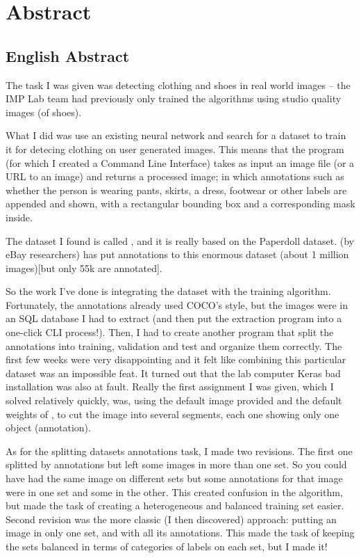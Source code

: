 \chapter*{Abstract}
\section*{English Abstract}

The task I was given was detecting clothing and shoes in real world images -- the IMP Lab team had previously only trained the algorithms using studio quality images (of shoes).

What I did was use an existing neural network and search for a dataset to train it for detecing clothing on user generated images. This means that the program (for which I created a Command Line Interface) takes as input an image file (or a URL to an image) and returns a processed image; in which annotations such as whether the person is wearing pants, skirts, a dress, footwear or other labels are appended and shown, with a rectangular bounding box and a corresponding mask inside.

The dataset I found is called \modanet, and it is really based on the Paperdoll dataset. \modanet (by eBay researchers) has put annotations to this enormous dataset (about 1 million images)[but only 55k are annotated].

So the work I've done is integrating the dataset with the training algorithm. Fortunately, the \modanet annotations already used COCO's style, but the images were in an SQL database I had to extract (and then put the extraction program into a one-click CLI process!).
Then, I had to create another program that split the annotations into training, validation and test and organize them correctly. The first few weeks were very disappointing and it felt like combining this particular dataset was an impossible feat. It turned out that the lab computer Keras bad installation was also at fault.
Really the first assignment I was given, which I solved relatively quickly, was, using the default image provided and the default weights of \maskrcnn, to cut the image into several segments, each one showing only one object (annotation).

As for the splitting datasets annotations task, I made two revisions. The first one splitted by annotations but left some images in more than one set. So you could have had the same image on different sets but some annotations for that image were in one set and some in the other. This created confusion in the algorithm, but made the task of creating a heterogeneous and balanced training set easier. Second revision was the more classic (I then discovered) approach: putting an image in only one set, and with all its annotations. This made the task of keeping the sets balanced in terms of categories of labels on each set, but I made it!

